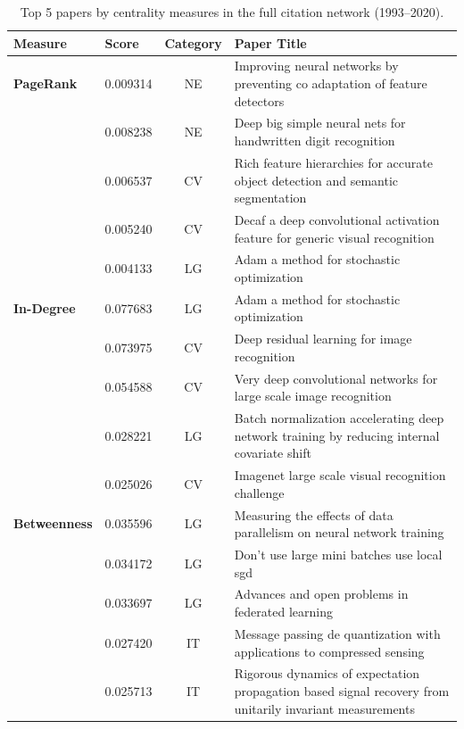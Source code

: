 \documentclass[11pt,a4paper]{article}
\begin{document}
\begin{table}[H]
\centering
\caption{Top 5 papers by centrality measures in the full citation network (1993--2020).}
\label{tab:centrality_full}
\begin{tabular}{llcp{8.5cm}}
\toprule
\textbf{Measure} & \textbf{Score} & \textbf{Category} & \textbf{Paper Title} \\
\midrule
\textbf{PageRank} 
 & 0.009314 & NE & Improving neural networks by preventing co adaptation of feature detectors \\
 & 0.008238 & NE & Deep big simple neural nets for handwritten digit recognition \\
 & 0.006537 & CV & Rich feature hierarchies for accurate object detection and semantic segmentation \\
 & 0.005240 & CV & Decaf a deep convolutional activation feature for generic visual recognition \\
 & 0.004133 & LG & Adam a method for stochastic optimization \\
\midrule
\textbf{In-Degree} 
 & 0.077683 & LG & Adam a method for stochastic optimization \\
 & 0.073975 & CV & Deep residual learning for image recognition \\
 & 0.054588 & CV & Very deep convolutional networks for large scale image recognition \\
 & 0.028221 & LG & Batch normalization accelerating deep network training by reducing internal covariate shift \\
 & 0.025026 & CV & Imagenet large scale visual recognition challenge \\
\midrule
\textbf{Betweenness} 
 & 0.035596 & LG & Measuring the effects of data parallelism on neural network training \\
 & 0.034172 & LG & Don't use large mini batches use local sgd \\
 & 0.033697 & LG & Advances and open problems in federated learning \\
 & 0.027420 & IT & Message passing de quantization with applications to compressed sensing \\
 & 0.025713 & IT & Rigorous dynamics of expectation propagation based signal recovery from unitarily invariant measurements \\
\bottomrule
\end{tabular}
\end{table}
\end{document}
